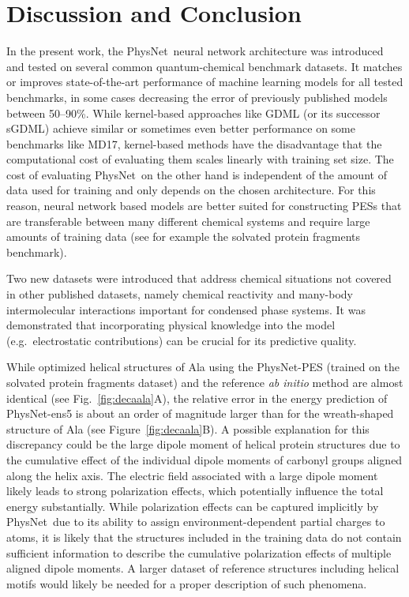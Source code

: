 \documentclass[12pt]{article}
\newcommand{\nn}{PhysNet}
\begin{document}
\section{Discussion and Conclusion}
\label{sec:discussion_and_conclusion}
In the present work, the \nn\ neural network architecture was
introduced and tested on several common quantum-chemical benchmark
datasets.  It matches or improves state-of-the-art performance of
machine learning models for all tested benchmarks, in some cases
decreasing the error of previously published models between 50--90\%.
While kernel-based approaches like GDML\cite{chmiela2017machine} (or
its successor sGDML\cite{chmiela2018towards}) achieve similar or
sometimes even better performance on some benchmarks like MD17,
kernel-based methods have the disadvantage that the computational cost
of evaluating them scales linearly with training set size. The cost of
evaluating \nn\ on the other hand is independent of the amount of data
used for training and only depends on the chosen architecture. For
this reason, neural network based models are better suited for
constructing PESs that are transferable between many different
chemical systems and require large amounts of training data (see for
example the solvated protein fragments benchmark).

Two new datasets were introduced that address chemical situations not
covered in other published datasets, namely chemical reactivity and
many-body intermolecular interactions important for condensed phase
systems. It was demonstrated that incorporating physical knowledge
into the model (e.g.\ electrostatic contributions) can be crucial for
its predictive quality.

While optimized helical structures of Ala using the \nn-PES
(trained on the solvated protein fragments dataset) and the reference
\textit{ab initio} method are almost identical (see
Fig.~\ref{fig:decaala}A), the relative error in the energy prediction
of \nn-ens5 is about an order of magnitude larger than for the
wreath-shaped structure of Ala (see
Figure~\ref{fig:decaala}B). A possible explanation for this
discrepancy could be the large dipole moment of helical protein
structures due to the cumulative effect of the individual dipole
moments of carbonyl groups aligned along the helix
axis.\cite{hol1978alpha} The electric field associated with a large
dipole moment likely leads to strong polarization effects, which
potentially influence the total energy substantially. While
polarization effects can be captured implicitly by \nn\ due to its
ability to assign environment-dependent partial charges to atoms, it
is likely that the structures included in the training data do not
contain sufficient information to describe the cumulative polarization
effects of multiple aligned dipole moments. A larger dataset of
reference structures including helical motifs would likely be needed
for a proper description of such phenomena.
\end{document}
